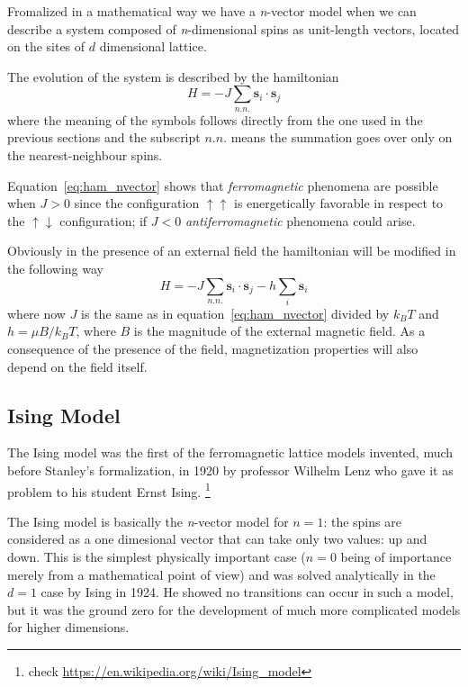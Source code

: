 Fromalized in a mathematical way we have a \textit{n}-vector model when we can 
describe a system composed of \textit{n}-dimensional spins as unit-length vectors,
located on the sites of $d$ dimensional lattice.

The evolution of the system is described by the hamiltonian
\begin{equation}
	H = - J \sum_{n.n.} \mathbf{s}_i \cdot \mathbf{s}_j
	\label{eq:ham_nvector}
\end{equation}
where the meaning of the symbols follows directly from the one used in the
previous sections and the subscript $n.n.$ means the summation goes over only
on the nearest-neighbour spins. 

Equation~\ref{eq:ham_nvector} shows that \emph{ferromagnetic} phenomena are  
possible when $J > 0$ since the configuration $\uparrow\uparrow$ is 
energetically favorable in respect to the $\uparrow\downarrow$ configuration; 
if $J < 0$ \emph{antiferromagnetic} phenomena could arise.

Obviously in the presence of an external field the hamiltonian will be modified
in the following way
\begin{equation}
\label{eq:ham_field}
H = - J \sum_{n.n.} \mathbf{s}_i \cdot \mathbf{s}_j - h \sum_i \mathbf{s}_i 
\end{equation}
where now $J$ is the same as in equation~\ref{eq:ham_nvector} divided by $k_B T$ 
and $h = \mu B / k_B T$, where $B$ is the magnitude of the external magnetic field. 
As a consequence of the presence of the field, magnetization properties will also 
depend on the field itself.


\subsection{Ising Model}

The Ising model was the first of the ferromagnetic lattice models invented, much 
before Stanley's formalization, in 1920 by professor Wilhelm Lenz who gave it as 
problem to his student Ernst Ising. \footnote{check \url{
https://en.wikipedia.org/wiki/Ising_model}}

The Ising model is basically the \textit{n}-vector model for $n=1$: the spins
are considered as a one dimesional vector that can take only two values: up and 
down. This is the simplest physically important case ($n=0$ being of importance merely
from a mathematical point of view) and was solved analytically in the $d=1$ case by
Ising in 1924. He showed no transitions can occur in such a model, but it was the
ground zero for the development of much more complicated models for higher
dimensions.

